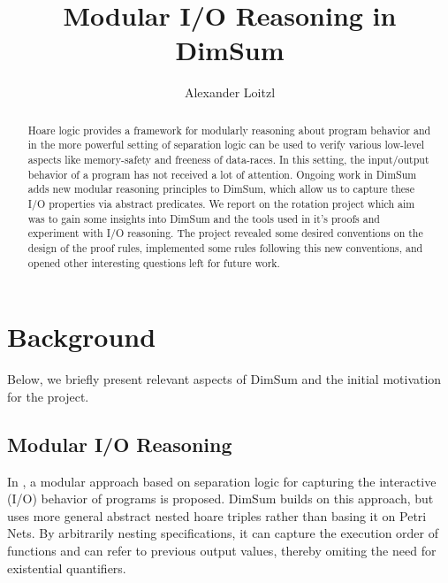 \documentclass[runningheads, orivec]{llncs}
\begin{document}
\title{Modular I/O Reasoning in DimSum}
%
%
\author{Alexander Loitzl\Envelope{}}%
%

%
\maketitle              %
%
%

\begin{abstract}
  Hoare logic provides a framework for modularly reasoning about program behavior and in the more powerful setting of separation logic can be used to verify various low-level aspects like memory-safety and freeness of data-races. In this setting, the input/output behavior of a program has not received a lot of attention. Ongoing work in DimSum adds new modular reasoning principles to DimSum, which allow us to capture these I/O properties via abstract predicates.
  We report on the rotation project which aim was to gain some insights into DimSum and the tools used in it's proofs and experiment with I/O reasoning. The project revealed some desired conventions on the design of the proof rules, implemented some rules following this new conventions, and opened other interesting questions left for future work.
\end{abstract}

\section{Background}
Below, we briefly present relevant aspects of DimSum\cite{dimsum} and the initial motivation for the project.
\subsection{Modular I/O Reasoning}

In \cite{io1,io2},  a modular approach based on separation logic for capturing the interactive (I/O) behavior of programs is proposed. DimSum builds on this approach, but uses more general abstract nested hoare triples rather than basing it on Petri Nets. By arbitrarily nesting specifications, it can capture the execution order of functions and can refer to previous output values, thereby omiting the need for existential quantifiers.
\end{document}
